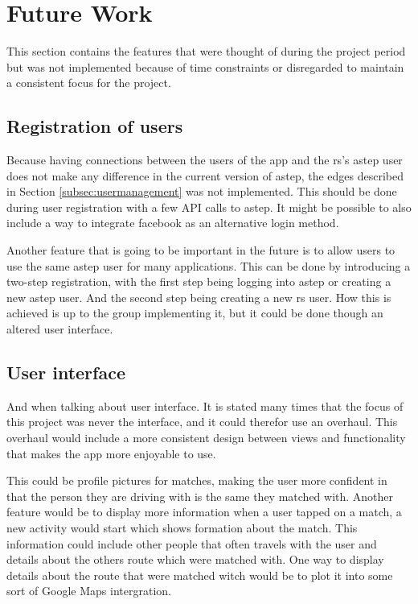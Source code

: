 \section{Future Work}\label{sec:future}
This section contains the features that were thought of during the project period but was not implemented because of time constraints or disregarded to maintain a consistent focus for the project.

\subsection{Registration of users}
Because having connections between the users of the app and the \gls{rs}'s \gls{astep} user does not make any difference in the current version of \gls{astep}, the edges described in Section \ref{subsec:usermanagement} was not implemented.
This should be done during user registration with a few API calls to \gls{astep}.
It might be possible to also include a way to integrate  facebook as an alternative login method.

Another feature that is going to be important in the future is to allow users to use the same \gls{astep} user for many applications.
This can be done by introducing a two-step registration, with the first step being logging into \gls{astep} or creating a new \gls{astep} user.
And the second step being creating a new \gls{rs} user.
How this is achieved is up to the group implementing it, but it could be done though an altered user interface.

\subsection{User interface}
And when talking about user interface.
It is stated many times that the focus of this project was never the interface, and it could therefor use an overhaul.
This overhaul would include a more consistent design between views and functionality that makes the app more enjoyable to use.

This could be profile pictures for matches, making the user more confident in that the person they are driving with is the same they matched with.
Another feature would be to display more information when a user tapped on a match, a new activity would start which shows formation about the match.
This information could include other people that often travels with the user and details about the others route which were matched with.
One way to display details about the route that were matched witch would be to plot it into some sort of Google Maps intergration.

